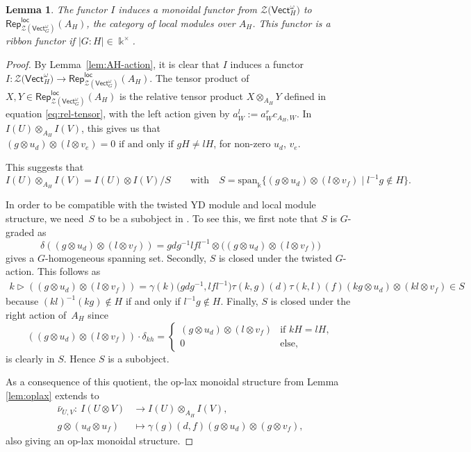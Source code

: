 \documentclass[10pt,a4paper]{amsart}
\numberwithin{equation}{section}
\newtheorem{Lemma}[Theorem]{Lemma}
\newcommand{\locmod}{\mathsf{Rep}^{\mathsf{loc}}}
\newcommand{\Vect}{\mathsf{Vect}}
\newcommand{\cZ}{\mathcal{Z}}
\newcommand{\rI}{I}
\begin{document}
\begin{Lemma}\label{lem:Imonoidal}
The functor $\rI$ induces a monoidal functor
from $\cZ\big(\Vect_H^\omega\big)$ to $\locmod_{\cZ(\Vect_G^\omega)}(A_H)$, the category of local modules over $A_H$. This functor is a ribbon functor if $|G:H|\in \Bbbk^\times$.
\end{Lemma}
\begin{proof}
By Lemma~\ref{lem:AH-action}, it is clear that $\rI$ induces a functor $\rI \colon \cZ\big(\Vect_H^\omega\big) \to \locmod_{\cZ(\Vect_G^\omega)}(A_H)$.
The tensor product of $X,Y \in \locmod_{\cZ(\Vect_G^\omega)}(A_H)$ is the relative tensor product $X\otimes_{A_H} Y$ defined in equation \eqref{eq:rel-tensor}, with the left action given by $a_W^l := a^r_W c_{A_H,W}$.
In $\rI(U) \otimes_{A_H} \rI(V)$, this gives us that $(g \otimes u_d) \otimes (l \otimes v_e) = 0 \text{ if and only if } gH \neq lH$, for non-zero $u_d$, $v_e$.

This suggests that \[\rI(U) \otimes_{A_H} \rI(V) = \rI(U) \otimes \rI(V)/S \qquad\text{with}\quad S = \mathrm{span}_\Bbbk\{(g\otimes u_d) \otimes (l\otimes v_f) \mid l^{-1}g \notin H\}.\]

In order to be compatible with the twisted YD module and local module structure, we need~$S$ to be a subobject in \smash{$\locmod_{\cZ(\Vect_G^\omega)}(A_H)$}.
To see this, we first note that $S$ is $G$-graded as \[\delta((g\otimes u_d) \otimes (l\otimes v_f)) = gdg^{-1}lfl^{-1} \otimes \big( (g\otimes u_d) \otimes (l\otimes v_f) \big)\] gives a $G$-homogeneous spanning set. Secondly, $S$ is closed under the twisted $G$-action. This follows as
\begin{gather*}
k \vartriangleright ((g\otimes u_d) \otimes (l\otimes v_f)) = \gamma(k)\big(gdg^{-1},lfl^{-1}\big)\tau(k,g)(d)\tau(k,l)(f)(kg\otimes u_d) \otimes (kl\otimes v_f) \!\in \! S
\end{gather*}
because $(kl)^{-1}(kg) \notin H$ if and only if $l^{-1}g\notin H$.
Finally, $S$ is closed under the right action of~$A_H$ since
\[((g\otimes u_d) \otimes (l\otimes v_f) ) \cdot \delta_{kh} =
\begin{cases}
(g\otimes u_d) \otimes (l\otimes v_f) & \text{if }kH = lH,\\
0 & \text{else},
\end{cases}
\]
is clearly in $S$. Hence $S$ is a subobject.

As a consequence of this quotient, the op-lax monoidal structure from Lemma \ref{lem:oplax} extends to
\begin{align*}
 \bar{\nu}_{U,V}\colon\ \rI(U\otimes V) &\longrightarrow \rI(U) \otimes_{A_H} \rI(V), \\
 g \otimes (u_d \otimes u_f) &\mapsto \gamma(g)(d,f) (g \otimes u_d) \otimes (g \otimes v_f),
\end{align*}
also giving an op-lax monoidal structure.


\end{proof}
\end{document}
